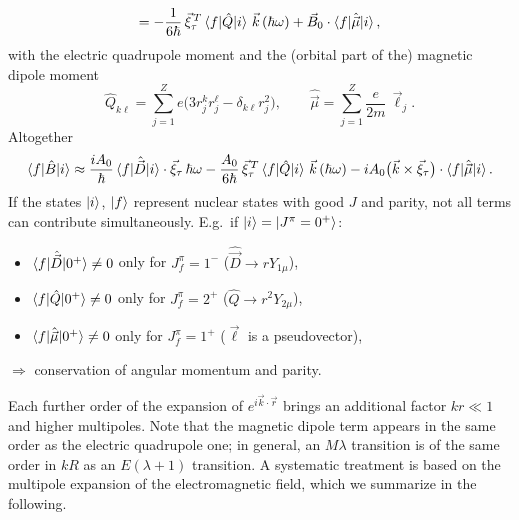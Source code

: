 \documentclass[11pt,a4paper]{article}
\newcommand{\op}[1]{\hat{#1}}
\begin{document}
\[
=-\frac{1}{6\hbar}\,\vec\xi^{\,T}_\tau\braket{f|\op Q|i}\,\vec k\,(\hbar\omega)+\vec B_0\cdot\braket{f|\op{\vec\mu}|i},
\]
with the electric quadrupole moment and the (orbital part of the) magnetic dipole moment
\[
\op Q_{k\ell}=\sum_{j=1}^Ze\big(3r^k_jr^\ell_j-\delta_{k\ell}r_j^2\big),
\qquad
\op{\vec\mu}=\sum_{j=1}^Z\frac{e}{2m}\,\vec\ell_j .
\]
Altogether
\[
\braket{f|\op B|i}\approx\frac{iA_0}{\hbar}\braket{f|\op{\vec D}|i}\cdot\vec\xi_\tau\,\hbar\omega
-\frac{A_0}{6\hbar}\,\vec\xi^{\,T}_\tau\braket{f|\op Q|i}\,\vec k\,(\hbar\omega)
-iA_0\big(\vec k\times\vec\xi_\tau\big)\cdot\braket{f|\op{\vec\mu}|i}.
\]
If the states $\ket i$, $\ket f$ represent nuclear states with good $J$ and parity, not all terms can contribute simultaneously. E.g.\ if $\ket i=\ket{J^\pi=0^+}$:
\begin{itemize}
\item $\braket{f|\op{\vec D}|0^+}\neq0$ only for $J^\pi_f=1^-$ ($\op{\vec D}\to rY_{1\mu}$),
\item $\braket{f|\op Q|0^+}\neq0$ only for $J^\pi_f=2^+$ ($\op Q\to r^2Y_{2\mu}$),
\item $\braket{f|\op{\vec\mu}|0^+}\neq0$ only for $J^\pi_f=1^+$ ($\vec\ell$ is a pseudovector),
\end{itemize}
$\Rightarrow$ conservation of angular momentum and parity.

Each further order of the expansion of $e^{i\vec k\cdot\vec r}$ brings an additional factor $kr\ll1$ and higher multipoles. Note that the magnetic dipole term appears in the same order as the electric quadrupole one; in general, an $M\lambda$ transition is of the same order in $kR$ as an $E(\lambda+1)$ transition. A systematic treatment is based on the multipole expansion of the electromagnetic field, which we summarize in the following.
\end{document}
